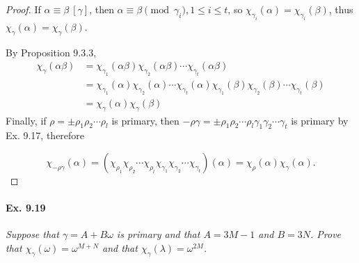 \documentclass[11pt,a4paper]{article}
\begin{document}
\begin{proof}
If $\alpha \equiv \beta\ [\gamma]$, then $\alpha \equiv \beta\pmod {\gamma_i}, 1 \leq i \leq t$, so $\chi_{\gamma_i}(\alpha) = \chi_{\gamma_i}(\beta)$, thus $\chi_\gamma(\alpha) = \chi_\gamma(\beta)$.

By Proposition 9.3.3,
\begin{align*}
\chi_\gamma(\alpha \beta) &= \chi_{\gamma_1}(\alpha \beta)\chi_{\gamma_2}(\alpha \beta)\cdots\chi_{\gamma_t}(\alpha \beta)\\
&= \chi_{\gamma_1}(\alpha)\chi_{\gamma_2}(\alpha)\cdots\chi_{\gamma_t}(\alpha)\chi_{\gamma_1}(\beta)\chi_{\gamma_2}(\beta)\cdots\chi_{\gamma_t}(\beta)\\
&= \chi_\gamma(\alpha) \chi_{\gamma}(\beta)
\end{align*}
Finally, if $\rho = \pm \rho_1\rho_2\cdots\rho_l$ is primary, then $-\rho \gamma = \pm \rho_1\rho_2\cdots\rho_l\gamma_1\gamma_2\cdots\gamma_t$ is primary by Ex. 9.17, therefore

$$\chi_{-\rho \gamma}(\alpha) = (\chi_{\rho_1} \chi_{\rho_2}\cdots \chi_{\rho_l}\chi_{\gamma_1} \chi_{\gamma_2}\cdots \chi_{\gamma_t} )(\alpha)= \chi_\rho(\alpha)\chi_\gamma(\alpha).$$
\end{proof}

\paragraph{Ex. 9.19}

{\it Suppose that $\gamma = A + B \omega$ is primary and that $A = 3M-1$ and $B = 3N$. Prove that $\chi_\gamma(\omega) = \omega^{M+N}$ and that $\chi_\gamma(\lambda) = \omega^{2M}$.
}
\end{document}
